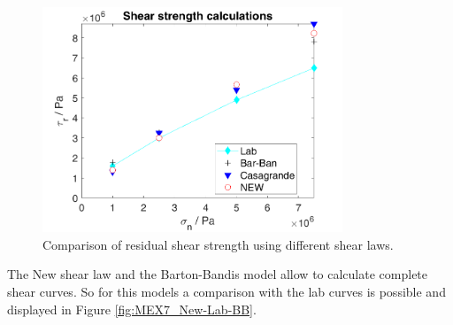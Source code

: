 \begin{figure}[!ht]
\begin{center}
\includegraphics[width=0.8\textwidth]{./figures/MEX7_Comparison_final_res.png}
\caption{Comparison of residual shear strength using different shear laws.}
\label{fig:MEX7_Comparison_final_ME1_Res}
\end{center}
\end{figure}

The New shear law and the Barton-Bandis model allow to calculate complete shear curves. So for this models a comparison with the lab curves is possible and displayed in Figure \ref{fig:MEX7_New-Lab-BB}. 

